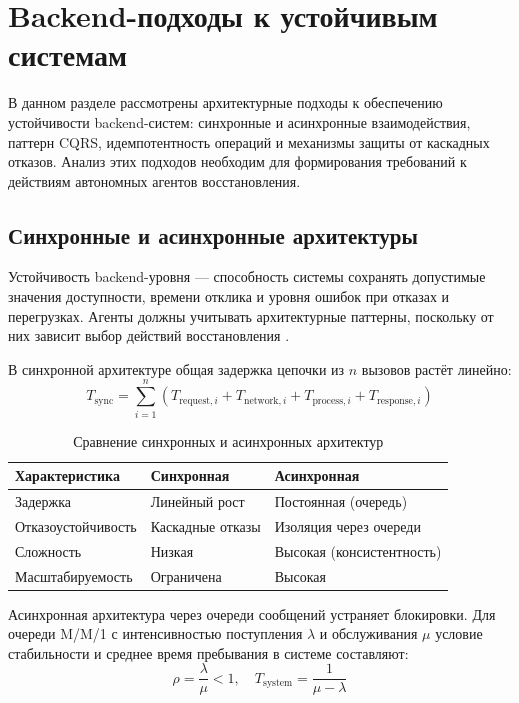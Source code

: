 \chapter{Backend-подходы к устойчивым системам}\label{ch:backend}

В данном разделе рассмотрены архитектурные подходы к обеспечению устойчивости backend-систем: синхронные и асинхронные взаимодействия, паттерн CQRS, идемпотентность операций и механизмы защиты от каскадных отказов. Анализ этих подходов необходим для формирования требований к действиям автономных агентов восстановления.

\section{Синхронные и асинхронные архитектуры}

Устойчивость backend-уровня --- способность системы сохранять допустимые значения доступности, времени отклика и уровня ошибок при отказах и перегрузках. Агенты должны учитывать архитектурные паттерны, поскольку от них зависит выбор действий восстановления \cite{russian_microservices}.

В синхронной архитектуре общая задержка цепочки из $n$ вызовов растёт линейно:
\begin{equation}
T_{\text{sync}} = \sum_{i=1}^{n} (T_{\text{request},i} + T_{\text{network},i} + T_{\text{process},i} + T_{\text{response},i})
\label{eq:sync_total_time}
\end{equation}

\begin{table}[H]
\centering
\small
\caption{Сравнение синхронных и асинхронных архитектур}
\label{tab:sync_async_compare}
\begin{tabular}{|>{\raggedright\arraybackslash}p{3.5cm}|>{\raggedright\arraybackslash}p{3.5cm}|>{\raggedright\arraybackslash}p{3.5cm}|}
\hline
Характеристика & Синхронная & Асинхронная \\
\hline
Задержка & Линейный рост & Постоянная (очередь) \\
\hline
Отказоустойчивость & Каскадные отказы & Изоляция через очереди \\
\hline
Сложность & Низкая & Высокая (консистентность) \\
\hline
Масштабируемость & Ограничена & Высокая \\
\hline
\end{tabular}
\end{table}

Асинхронная архитектура через очереди сообщений \cite{kleppmann_designing_data} устраняет блокировки. Для очереди M/M/1 с интенсивностью поступления $\lambda$ и обслуживания $\mu$ условие стабильности и среднее время пребывания в системе составляют:
\begin{equation}
\rho = \frac{\lambda}{\mu} < 1, \quad T_{\text{system}} = \frac{1}{\mu - \lambda}
\label{eq:queue_stability}
\end{equation}


